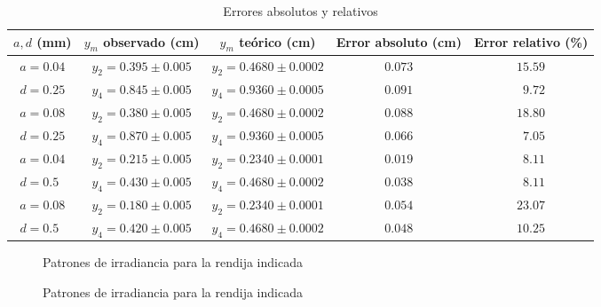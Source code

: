 \documentclass[10pt,a4paper]{article}
\begin{document}
 	\begin{table}[!htb]
 		\centering
 		\caption{Errores absolutos y relativos}
 		\begin{tabular}{|c|c|c|c|c|}
 			\hline
 			$ a, d $ (mm) & $ y_m $ observado (cm) & $ y_m $ teórico (cm) & Error absoluto (cm) & Error relativo (\%)  \\
 			\hline
 			$ a=0.04 $          & $y_2=0.395\pm 0.005 $ & $y_2=0.4680\pm0.0002 $ & $ 0.073 $ & $ 15.59 $ \\ \cline{2-5}
 			$ d=0.25 $          & $y_4=0.845\pm 0.005 $ & $y_4=0.9360\pm0.0005 $ & $ 0.091 $ & $ \phantom{0}9.72 $ \\ \hline
 			$ a=0.08 $          & $y_2=0.380\pm 0.005 $ & $y_2=0.4680\pm0.0002 $ & $ 0.088 $ & $ 18.80 $ \\ \cline{2-5}
 			$ d=0.25 $          & $y_4=0.870\pm 0.005 $ & $y_4=0.9360\pm0.0005 $ & $ 0.066 $ & $ \phantom{0}7.05 $ \\ \hline
 			$ a=0.04 $          & $y_2=0.215\pm 0.005 $ & $y_2=0.2340\pm0.0001 $ & $ 0.019 $ & $ \phantom{0}8.11 $ \\ \cline{2-5}
 			$ d=0.5\phantom{0} $& $y_4=0.430\pm 0.005 $ & $y_4=0.4680\pm0.0002 $ & $ 0.038 $ & $ \phantom{0}8.11 $ \\ \hline
 			$ a=0.08 $          & $y_2=0.180\pm 0.005 $ & $y_2=0.2340\pm0.0001 $ & $ 0.054 $ & $ 23.07 $ \\ \cline{2-5}
 			$ d=0.5\phantom{0} $& $y_4=0.420\pm 0.005 $ & $y_4=0.4680\pm0.0002 $ & $ 0.048 $ & $ 10.25 $ \\ \hline
 		\end{tabular} 
 		\label{tab:errores}
 	\end{table}
 	 
	\begin{figure}[htbp!]
		\centering
		\hfill
		\hfill
		\hfill
		\caption{Patrones de irradiancia para la rendija indicada}
		\label{fig:P1}
	\end{figure}

	\begin{figure}[htbp!]
		\centering
		\hfill
		\hfill
		\hfill
		\caption{Patrones de irradiancia para la rendija indicada}
		\label{fig:P2}
	\end{figure}
\end{document}
